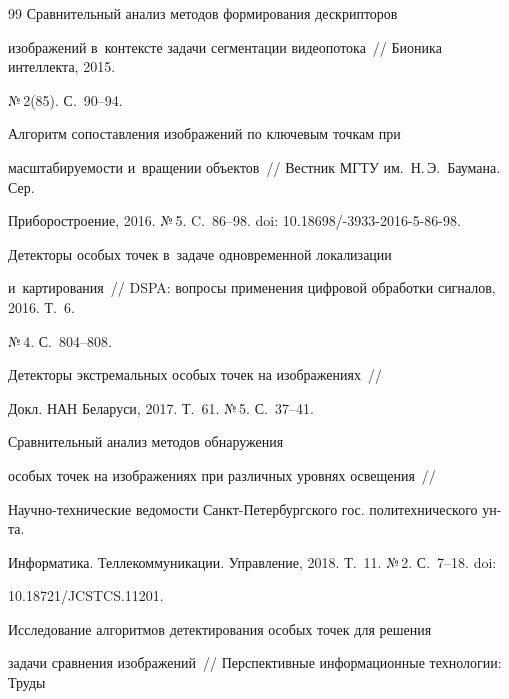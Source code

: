 {{\begin{thebibliography}{99}
   Сравнительный анализ методов формирования дескрипторов 


изображений в~кон\-текс\-те задачи сег\-мен\-та\-ции видеопотока~/\!\!/ Бионика интеллекта, 2015. 


№\,2(85). С.~90--94.







   Алгоритм со\-по\-став\-ле\-ния изображений по ключевым точкам при 


мас\-шта\-би\-ру\-емости и~вращении объектов~/\!\!/ Вестник МГТУ им.\ Н.\,Э.~Баумана. Сер. 


Приборостроение, 2016. №\,5. C.~86--98. doi: 10.18698\!/-3933-2016-5-86-98.







   Детекторы особых точек в~задаче одновременной локализации 


и~картирования~/\!\!/ DSPA: вопросы применения цифровой обработки сигналов, 2016. Т.~6. 


№\,4. С.~804--808. 







   Детекторы экстремальных особых точек на изображениях~/\!\!/ 


Докл. НАН Беларуси, 2017. Т.~61. №\,5. С.~37--41.




   Сравнительный анализ методов обнаружения 


особых точек на изображениях при различных уровнях освещения~/\!\!/ 


 На\-уч\-но-тех\-ни\-че\-ские ведомости Санкт-Пе\-тер\-бург\-ско\-го гос. политехнического ун-та.


 Информатика. Теллекоммуникации. Управ\-ле\-ние, 2018. Т.~11. №\,2. С.~7--18. doi: 


10.18721\!/\!JCSTCS.11201.




   Исследование алгоритмов детектирования особых точек для решения 


задачи сравнения изображений~/\!\!/ Перспективные информационные технологии: Труды 



\end{thebibliography}}}
